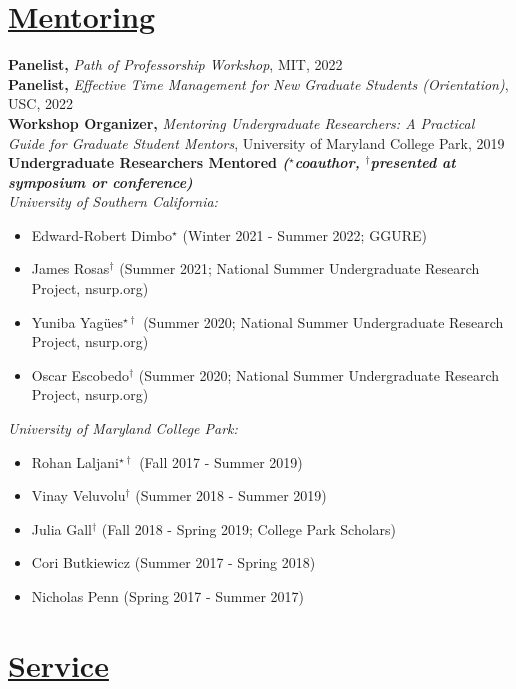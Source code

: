 \documentclass[]{res}
\begin{document}
\begin{resume}
\section{\underline{Mentoring}} \vspace{2mm}
{\bf Panelist,} \emph{Path of Professorship Workshop}, MIT, 2022\\
{\bf Panelist,} \emph{Effective Time Management for New Graduate Students (Orientation)}, USC, 2022\\
{\bf Workshop Organizer,} \emph{Mentoring Undergraduate Researchers: A Practical Guide for Graduate Student Mentors}, University of Maryland College Park, 2019\\
{\bf Undergraduate Researchers Mentored \emph{\footnotesize{($^{\star}$coauthor, $^{\dagger}$presented at symposium or conference)}}} \\
\emph{University of Southern California:}
\begin{itemize}[leftmargin=*]
\item[] Edward-Robert Dimbo$^{\star}$ (Winter 2021 - Summer 2022; GGURE)
\item[] James Rosas$^{\dagger}$ (Summer 2021; National Summer Undergraduate Research Project, nsurp.org)
\item[] Yuniba Yag{\"u}es$^{\star\dagger}$ (Summer 2020; National Summer Undergraduate Research Project, nsurp.org)
\item[] Oscar Escobedo$^{\dagger}$ (Summer 2020; National Summer Undergraduate Research Project, nsurp.org)
\end{itemize}
\vspace{1mm}
\emph{University of Maryland College Park:}
\begin{itemize}[leftmargin=*]
\item[] Rohan Laljani$^{\star\dagger}$ (Fall 2017 - Summer 2019)
\item[] Vinay Veluvolu$^{\dagger}$ (Summer 2018 - Summer 2019)
\item[] Julia Gall$^{\dagger}$ (Fall 2018 - Spring 2019; College Park Scholars)
\item[] Cori Butkiewicz (Summer 2017 - Spring 2018)
\item[] Nicholas Penn (Spring 2017 - Summer 2017)
\end{itemize}


\section{\underline{Service}} \vspace{2mm}


\end{resume}
\end{document}
